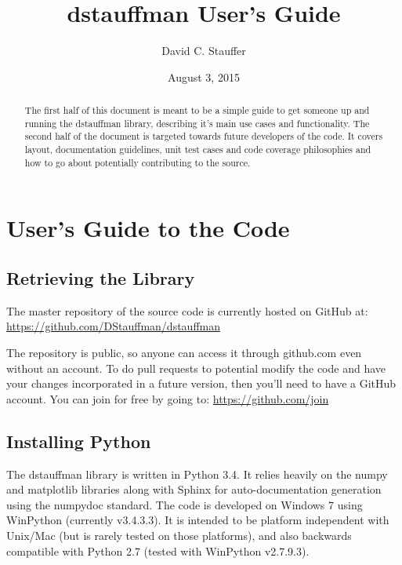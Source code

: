 \documentclass[12pt]{article}
\begin{document}
\title{dstauffman User's Guide}
\author{David C. Stauffer}
\date{August 3, 2015}
\maketitle

\begin{abstract}\label{Abstract}
The first half of this document is meant to be a simple guide to get someone up and running the dstauffman library, describing it's main use cases and functionality.  The second half of the document is targeted towards future developers of the code.  It covers layout, documentation guidelines, unit test cases and code coverage philosophies and how to go about potentially contributing to the source.
\end{abstract}

\begin{versionhistory}
\end{versionhistory}

\pagebreak
\tableofcontents
{}

\pagebreak
\listoffigures
{}
\listoftables
{}

\pagebreak
\section{User's Guide to the Code}\label{h1:Users_guide}
\subsection{Retrieving the Library}\label{h2:Retrieving_the_library}
The master repository of the source code is currently hosted on GitHub at:
\newline\url{https://github.com/DStauffman/dstauffman}

The repository is public, so anyone can access it through github.com even without an account.  To do pull requests to potential modify the code and have your changes incorporated in a future version, then you'll need to have a GitHub account.  You can join for free by going to:
\newline\url{https://github.com/join}

\subsection{Installing Python}\label{h2:Installing Python}
The dstauffman library is written in Python 3.4.  It relies heavily on the numpy and matplotlib libraries along with Sphinx for auto-documentation generation using the numpydoc standard.  The code is developed on Windows 7 using WinPython (currently v3.4.3.3).  It is intended to be platform independent with Unix/Mac (but is rarely tested on those platforms), and also backwards compatible with Python 2.7 (tested with WinPython v2.7.9.3).
\end{document}
